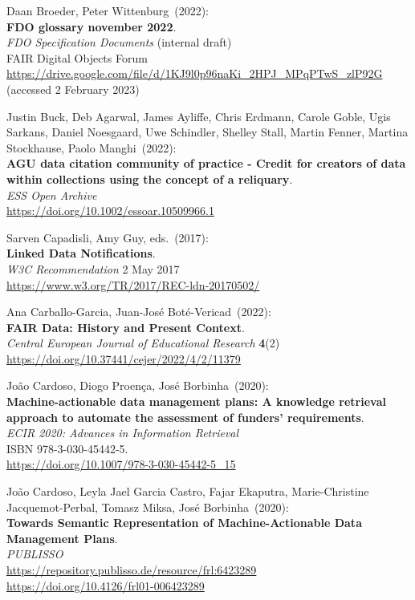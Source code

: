 \begin{thebibliography}{9}
Daan Broeder, Peter Wittenburg~(2022): \\
\textbf{{FDO} glossary november 2022}.\\
\emph{FDO Specification Documents} (internal draft)\\
FAIR Digital Objects Forum\\
\url{https://drive.google.com/file/d/1KJ9l0p96naKi_2HPJ_MPqPTwS_zlP92G}
(accessed 2 February 2023)

Justin Buck, Deb Agarwal, James Ayliffe, Chris Erdmann, Carole Goble, Ugis Sarkans, Daniel Noesgaard, Uwe Schindler, Shelley Stall, Martin Fenner, Martina Stockhause, Paolo Manghi~(2022): \\
\textbf{AGU data citation community of practice - Credit for creators of data within collections using the concept of a reliquary}.\\ 
\emph{ESS Open Archive}\\
\url{https://doi.org/10.1002/essoar.10509966.1}

Sarven Capadisli, Amy Guy, eds.~(2017): \\
\textbf{Linked Data Notifications}.\\
\emph{W3C Recommendation} 2 May 2017 \\
\url{https://www.w3.org/TR/2017/REC-ldn-20170502/}

Ana Carballo-Garcia, Juan-José Boté-Vericad~(2022):\\
\textbf{FAIR Data: History and Present Context}.\\
\emph{Central European Journal of Educational Research} \textbf{4}(2)\\
\url{https://doi.org/10.37441/cejer/2022/4/2/11379}

João Cardoso, Diogo Proença, José Borbinha~(2020): \\
\textbf{Machine-actionable data management plans: A knowledge retrieval approach to automate the assessment of funders' requirements}.\\
\emph{ECIR 2020: Advances in Information Retrieval}\\
ISBN 978-3-030-45442-5.\\
\url{https://doi.org/10.1007/978-3-030-45442-5_15}

João Cardoso, Leyla Jael Garcia Castro, Fajar Ekaputra, Marie-Christine Jacquemot-Perbal, Tomasz Miksa, José Borbinha~(2020): \\
\textbf{Towards Semantic Representation of Machine-Actionable Data Management Plans}.\\
\emph{PUBLISSO}\\
\url{https://repository.publisso.de/resource/frl:6423289}\\
\url{https://doi.org/10.4126/frl01-006423289}


\end{thebibliography}
